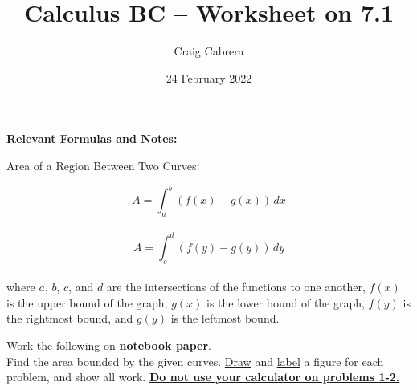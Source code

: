 \documentclass[10pt,letterpaper]{report}
\title{Calculus BC -- Worksheet on 7.1}
\author{Craig Cabrera}
\date{24 February 2022}
\begin{document}
\maketitle
\begin{center}
  \textbf{\underline{Relevant Formulas and Notes:}}
\end{center}

\noindent Area of a Region Between Two Curves: 

$$A=\int_{a}^{b}{\left(f(x)-g(x)\right)}\,dx$$ \\

$$A=\int_{c}^{d}{\left(f(y)-g(y)\right)}\,dy$$ \\

\noindent where $a$, $b$, $c$, and $d$ are the intersections of the functions to one another, $f(x)$ is the upper bound of the graph, $g(x)$ is the lower bound of the graph, $f(y)$ is the rightmost bound, and $g(y)$ is the leftmost bound. 

\pagebreak 

\noindent Work the following on \textbf{\underline{notebook paper}}. \\

\noindent Find the area bounded by the given curves. \underline{Draw} and \underline{label} a figure for each problem, and show all work. \textbf{\underline{Do not use your calculator on problems 1-2.}} \\
\end{document}
